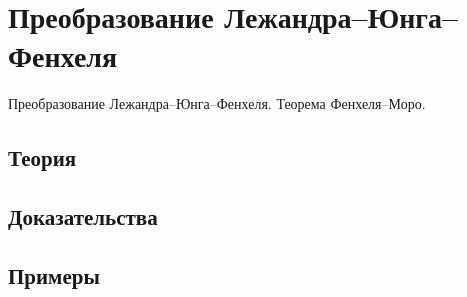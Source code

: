 
\section{Преобразование Лежандра–Юнга–Фенхеля}
\label{sec:2.4.04-legendre-fenchel}

\begin{ticket}
Преобразование Лежандра–Юнга–Фенхеля. Теорема Фенхеля–Моро.
\end{ticket}

\subsection*{Теория}

\subsection*{Доказательства}

\subsection*{Примеры}
